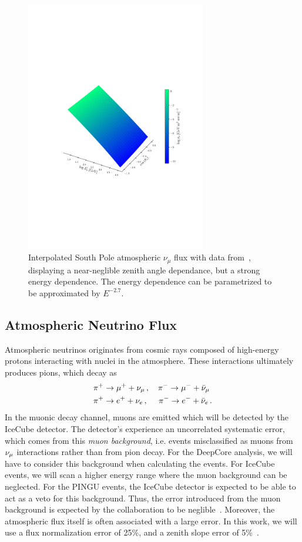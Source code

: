 \begin{figure}[t]\label{fig:flux}
    \includegraphics[width=0.7\textwidth]{figures/flux.pdf}
    \caption{Interpolated South Pole atmospheric $\nu_\mu$ flux with data from~\cite{hondaArticle}, displaying a near-neglible 
    zenith angle dependance, but a strong energy dependence. The energy dependence can be parametrized to be approximated by $E^{-2.7}$.}
\end{figure}

\subsection{Atmospheric Neutrino Flux}
Atmospheric neutrinos originates from cosmic rays composed of high-energy protons interacting with nuclei in the atmosphere.
These interactions ultimately produces pions, which decay as 
\begin{align}\label{eq:pion}
    &\pi^+ \to \mu^+ + \nu_\mu\,, \quad \pi^- \to \mu^- + \bar{\nu}_\mu \nonumber \\
    &\pi^+ \to e^+ + \nu_e\,,\,\, \quad \pi^- \to e^- + \bar{\nu}_e\,.
\end{align}
In the muonic decay channel, muons are emitted which will be detected by the IceCube detector.
The detector's experience an uncorrelated systematic error, which comes from this \emph{muon background}, 
i.e. events misclassified as muons from 
$\nu_\mu$ interactions rather than from pion decay. For the DeepCore analysis, we will have to consider this background when calculating the events.
For IceCube events, we will scan a higher energy range where the muon background can be neglected. For the PINGU events, the IceCube detector is 
expected to be able to act as a veto for this background. Thus, the error introduced from the muon background is expected by the collaboration 
to be neglible~\cite{PINGUletter}.
Moreover, the atmospheric flux itself is often associated with a large error.
In this work, we will use a flux normalization error of 25\%, and a zenith slope error of 5\%~\cite{hondapaper}.

